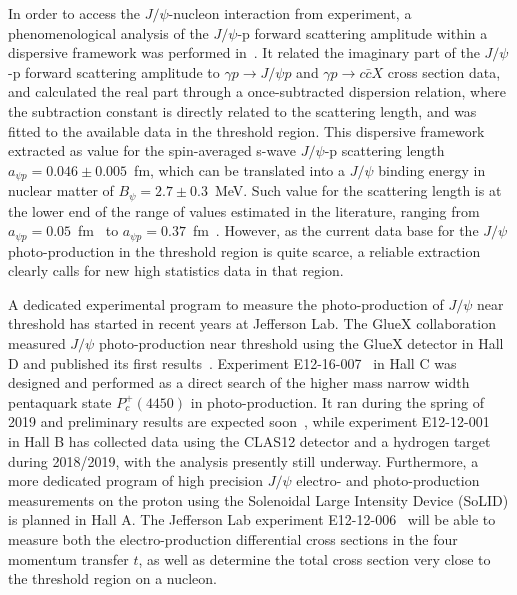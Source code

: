 \documentclass[prd,amsmath,%
twocolumn,floatfix,amssymb, preprintnumbers, linenumbers,nofootinbib, superscriptaddress]{revtex4}
\begin{document}
In order to access the $J/\psi$-nucleon interaction from experiment, a phenomenological analysis of the $J/\psi$-p forward scattering amplitude within a dispersive framework was performed in~\cite{Gryniuk:2016mpk}. It related the imaginary part of the $J/\psi$-p forward scattering amplitude 
to $\gamma p \to J/\psi p$ and $\gamma p \to c \bar c X$ cross section data, and calculated the real part through a once-subtracted dispersion relation, where the subtraction constant is directly related to the scattering length, and was fitted to the available data in the threshold region.   
This dispersive framework extracted as value for the spin-averaged s-wave $J/\psi$-p scattering length $a_{\psi p} = 0.046 \pm 0.005$~fm, which can be translated into a 
$J/\psi$ binding energy in nuclear matter 
of $B_{\psi} = 2.7 \pm 0.3$~MeV. Such value for the scattering length is at the lower end of the range of values estimated in the literature, ranging from 
$a_{\psi p} = 0.05$~fm~\cite{Kaidalov:1992hd} to 
$a_{\psi p} = 0.37$~fm~\cite{Sibirtsev:2005ex}. However, as the current data base for the $J/\psi$ photo-production in the threshold region is quite scarce, a reliable extraction clearly calls for new high statistics data in that region.  

A dedicated experimental program to measure the  photo-production of $J/\psi$ near threshold  has started in recent years at Jefferson Lab. The GlueX collaboration measured $J/\psi$ photo-production near threshold using the GlueX detector in Hall D and published its first  results~\cite{Ali:2019lzf}. Experiment E12-16-007~\cite{Meziani:2016lhg} in Hall C was designed and performed as a direct search of the higher mass narrow width pentaquark state $P_c^+(4450)$ in photo-production. It ran during the spring of 2019 and preliminary results are expected soon~\cite{Joosten:2020}, while experiment E12-12-001~\cite{CLAS12-tcs:proposal} in Hall B has collected data using the CLAS12 detector and a hydrogen target during  2018/2019, with the analysis presently still underway. Furthermore, a more dedicated program of high precision $J/\psi$ electro- and photo-production  measurements on the proton  using the Solenoidal Large Intensity Device (SoLID) is planned in Hall A. The Jefferson Lab experiment E12-12-006~\cite{SoLIDjpsi:proposal} will be able to measure both the electro-production differential cross sections in the four momentum transfer $t$, as well as determine the total cross section very close to the threshold region on a nucleon.  
\end{document}
